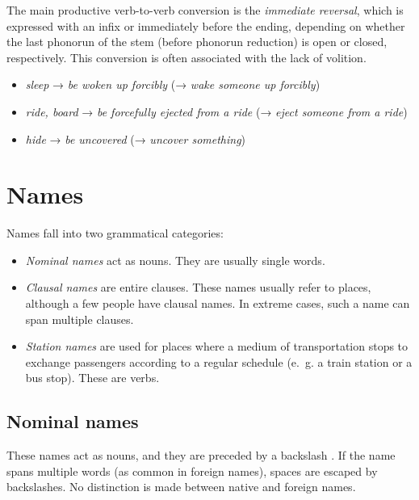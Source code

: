 \documentclass{book}
\begin{document}
The main productive verb-to-verb conversion is the \emph{immediate reversal}, which is expressed with an infix  or  immediately before the ending, depending on whether the last phonorun of the stem (before phonorun reduction) is open or closed, respectively. This conversion is often associated with the lack of volition.

\begin{itemize}
    \item {} \emph{sleep} →  \emph{be woken up forcibly} (→  \emph{wake someone up forcibly})
    \item {} \emph{ride, board} →  \emph{be forcefully ejected from a ride} (→  \emph{eject someone from a ride})
    \item {} \emph{hide} →  \emph{be uncovered} (→  \emph{uncover something})
\end{itemize}

\chapter{Names}

Names fall into two grammatical categories:

\begin{itemize}
    \item \emph{Nominal names} act as nouns. They are usually single words.
    \item \emph{Clausal names} are entire clauses. These names usually refer to places, although a few people have clausal names. In extreme cases, such a name can span multiple clauses.
    \item \emph{Station names} are used for places where a medium of transportation stops to exchange passengers according to a regular schedule (e.~g. a train station or a bus stop). These are verbs.
\end{itemize}

\section{Nominal names}

These names act as nouns, and they are preceded by a backslash \hortho{\bs}. If the name spans multiple words (as common in foreign names), spaces are escaped by backslashes. No distinction is made between native and foreign names.
\end{document}
